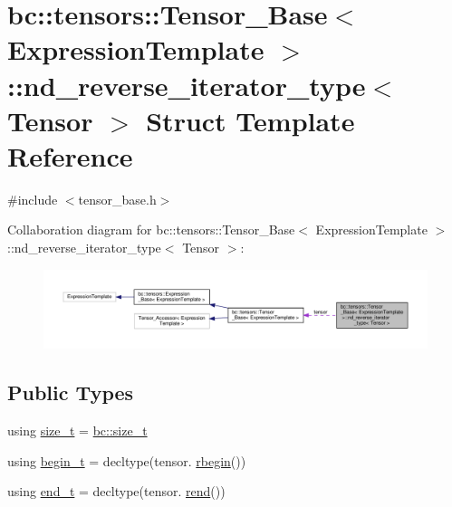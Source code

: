 \hypertarget{structbc_1_1tensors_1_1Tensor__Base_1_1nd__reverse__iterator__type}{}\section{bc\+:\+:tensors\+:\+:Tensor\+\_\+\+Base$<$ Expression\+Template $>$\+:\+:nd\+\_\+reverse\+\_\+iterator\+\_\+type$<$ Tensor $>$ Struct Template Reference}
\label{structbc_1_1tensors_1_1Tensor__Base_1_1nd__reverse__iterator__type}


{\ttfamily \#include $<$tensor\+\_\+base.\+h$>$}



Collaboration diagram for bc\+:\+:tensors\+:\+:Tensor\+\_\+\+Base$<$ Expression\+Template $>$\+:\+:nd\+\_\+reverse\+\_\+iterator\+\_\+type$<$ Tensor $>$\+:\nopagebreak
\begin{figure}[H]
\begin{center}
\leavevmode
\includegraphics[width=350pt]{structbc_1_1tensors_1_1Tensor__Base_1_1nd__reverse__iterator__type__coll__graph}
\end{center}
\end{figure}
\subsection*{Public Types}
\begin{DoxyCompactItemize}
\item 
using \hyperlink{structbc_1_1tensors_1_1Tensor__Base_1_1nd__reverse__iterator__type_a7d4012a381490c1667a2fc0d6b7c0df4}{size\+\_\+t} = \hyperlink{namespacebc_aaf8e3fbf99b04b1b57c4f80c6f55d3c5}{bc\+::size\+\_\+t}
\item 
using \hyperlink{structbc_1_1tensors_1_1Tensor__Base_1_1nd__reverse__iterator__type_ae1257b60d15e216d87339e89db5df9bc}{begin\+\_\+t} = decltype(tensor. \hyperlink{classbc_1_1tensors_1_1Tensor__Base_ac00d10e279006dbdd13345d73824424c}{rbegin}())
\item 
using \hyperlink{structbc_1_1tensors_1_1Tensor__Base_1_1nd__reverse__iterator__type_a67cf55832f75d57560aa163bdaa89217}{end\+\_\+t} = decltype(tensor. \hyperlink{classbc_1_1tensors_1_1Tensor__Base_a91727f32f3b0182772ebb7968259c5e1}{rend}())
\end{DoxyCompactItemize}
